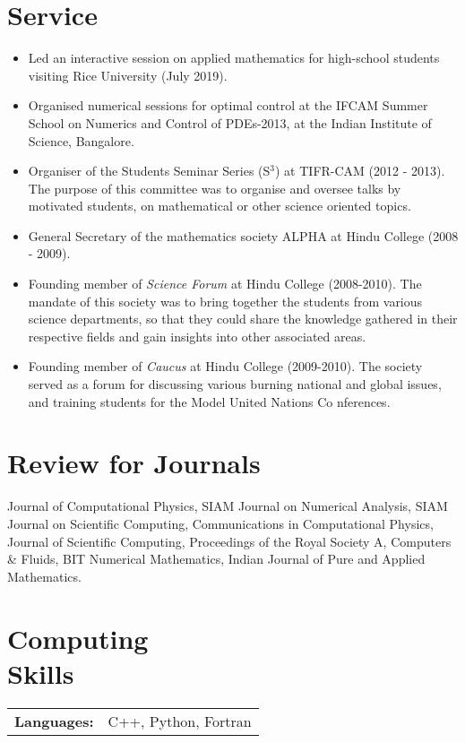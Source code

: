 \documentclass[margin]{res}
\begin{document}
\begin{resume}
\section{Service} 
               \begin{itemize} \itemsep -2pt
               \item Led an interactive session on applied mathematics for high-school students visiting Rice University (July 2019). 
                \item Organised numerical sessions for optimal control at the IFCAM Summer School on Numerics and Control of PDEs-2013, at the Indian Institute of Science, Bangalore.
               \item Organiser of the Students Seminar Series (S$^3$) at TIFR-CAM (2012 - 2013). The purpose of this committee was to organise and oversee talks by motivated students, on mathematical or other science oriented topics.   
               \item General Secretary of the mathematics society ALPHA at Hindu College (2008 - 2009). 
               \item Founding member of {\it Science Forum} at Hindu College (2008-2010). The mandate of this society was to bring together the students from various science departments, so that they could share the knowledge gathered in their respective fields and gain insights into other associated areas.
               \item Founding member of {\it Caucus} at Hindu College (2009-2010). The society served as a forum for discussing various burning national and global issues, and training students for the Model United Nations Co	 nferences.
               \end{itemize}                    
               
\section{Review for Journals}  
              Journal of Computational Physics, SIAM Journal on Numerical Analysis, SIAM Journal on Scientific Computing, Communications in Computational Physics, Journal of Scientific Computing, Proceedings of the Royal Society A, Computers \& Fluids, BIT Numerical Mathematics, Indian Journal of Pure and Applied Mathematics.
               
               
\section{Computing \\Skills}
   \noindent\begin{tabular}{@{}ll}
    {\bf Languages:} & C++, Python, Fortran \\


\end{tabular}
\end{resume}
\end{document}
